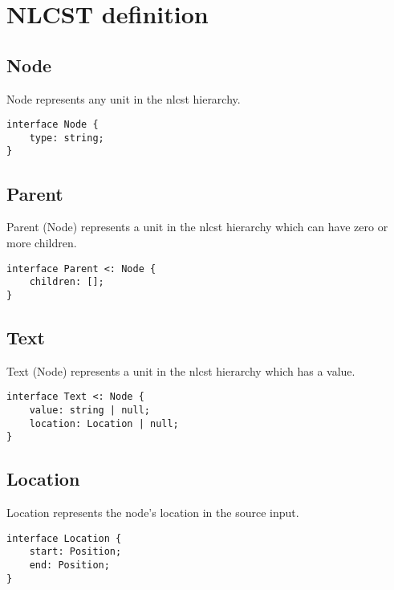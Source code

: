 
\chapter{NLCST definition}\label{appendix-nlcst}

\section*{Node}\label{node}

Node represents any unit in the \gls{nlcst} hierarchy.

\begin{lstlisting}
interface Node {
    type: string;
}
\end{lstlisting}

\section*{Parent}\label{parent}

Parent (Node) represents a unit in the \gls{nlcst} hierarchy which can have
  zero or more children.

\begin{lstlisting}
interface Parent <: Node {
    children: [];
}
\end{lstlisting}

\section*{Text}\label{text}

Text (Node) represents a unit in the \gls{nlcst} hierarchy which has a
  value.

\begin{lstlisting}
interface Text <: Node {
    value: string | null;
    location: Location | null;
}
\end{lstlisting}

\section*{Location}\label{location}

Location represents the node's location in the source input.

\begin{lstlisting}
interface Location {
    start: Position;
    end: Position;
}
\end{lstlisting}


